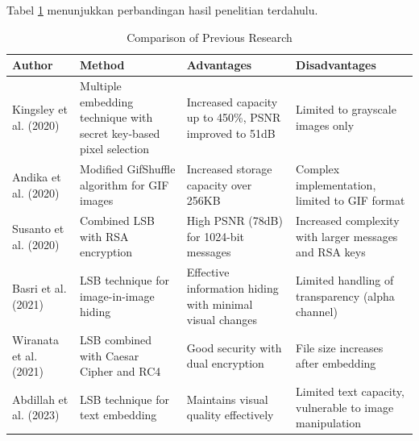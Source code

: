 \documentclass{ittelkom}
\begin{document}
Tabel \ref{tab:comparison} menunjukkan perbandingan hasil penelitian terdahulu.

\begin{table}[h!]
    \caption{Comparison of Previous Research}
    \begin{tabularx}{\textwidth}{|p{2cm}|X|p{2.5cm}|p{2.5cm}|}
        \hline
        \textbf{Author}        & \textbf{Method}                                                    & \textbf{Advantages}                                      & \textbf{Disadvantages}                                  \\
        \hline
        Kingsley et al. (2020) & Multiple embedding technique with secret key-based pixel selection & Increased capacity up to 450\%, PSNR improved to 51dB    & Limited to grayscale images only                        \\
        \hline
        Andika et al. (2020)   & Modified GifShuffle algorithm for GIF images                       & Increased storage capacity over 256KB                    & Complex implementation, limited to GIF format           \\
        \hline
        Susanto et al. (2020)  & Combined LSB with RSA encryption                                   & High PSNR (78dB) for 1024-bit messages                   & Increased complexity with larger messages and RSA keys  \\
        \hline
        Basri et al. (2021)    & LSB technique for image-in-image hiding                            & Effective information hiding with minimal visual changes & Limited handling of transparency (alpha channel)        \\
        \hline
        Wiranata et al. (2021) & LSB combined with Caesar Cipher and RC4                            & Good security with dual encryption                       & File size increases after embedding                     \\
        \hline
        Abdillah et al. (2023) & LSB technique for text embedding                                   & Maintains visual quality effectively                     & Limited text capacity, vulnerable to image manipulation \\
        \hline
    \end{tabularx}
    \label{tab:comparison}
\end{table}
\end{document}
